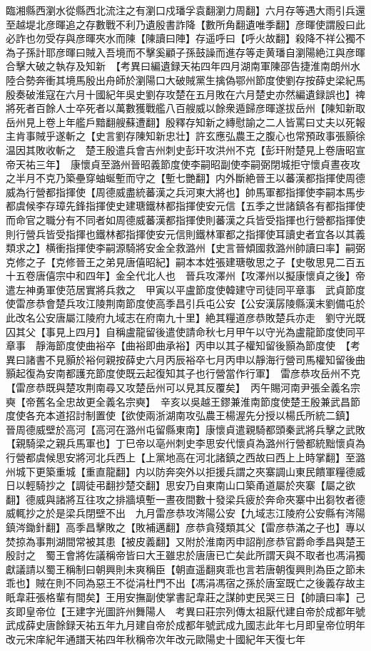 臨湘縣西瀏水從縣西北流注之有瀏口戍璠孚袁翻瀏力周翻】六月存等遇大雨引兵還至越堤北彦暉追之存數戰不利乃遺殷書詐降【數所角翻遺唯季翻】彦暉使謂殷曰此必詐也勿受存與彦暉夾水而陳【陳讀曰陣】存遥呼曰【呼火故翻】殺降不祥公獨不為子孫計耶彦暉曰賊入吾境而不擊奚顧子孫鼓譟而進存等走黄璠自瀏陽絶江與彦暉合擊大破之執存及知新　【考異曰編遺録天祐四年四月湖南軍陳邵告捷淮南朗州水陸合勢奔衝其境馬殷出舟師於瀏陽口大破賊黨生擒偽鄂州節度使劉存按薛史梁紀馬殷奏破淮寇在六月十國紀年吳史劉存攻楚在五月敗在六月楚史亦然編遺録誤也】禆將死者百餘人士卒死者以萬數獲戰艦八百艘威以餘衆遁歸彦暉遂拔岳州【陳知新取岳州見上卷上年艦戶黯翻艘蘇遭翻】殷釋存知新之縳慰諭之二人皆罵曰丈夫以死報主肯事賊乎遂斬之【史言劉存陳知新忠壮】許玄應弘農王之腹心也常預政事張顥徐温因其敗收斬之　楚王殷遣兵會吉州刺史彭玕攻洪州不克【彭玕附楚見上卷唐昭宣帝天祐三年】　康懷貞至潞州晉昭義節度使李嗣昭副使李嗣弼閉城拒守懷貞晝夜攻之半月不克乃築壘穿蚰蜒塹而守之【塹七艷翻】内外斷絶晉王以蕃漢都指揮使周德威為行營都指揮使【周德威盡統蕃漢之兵河東大將也】帥馬軍都指揮使李嗣本馬步都虞候李存璋先鋒指揮使史建瑭鐵林都指揮使安元信【五季之世諸鎮各有都指揮使而命官之職分有不同者如周德威蕃漢都指揮使則蕃漢之兵皆受指揮也行營都指揮使則行營兵皆受指揮也鐵林都指揮使安元信則鐵林軍都之指揮使耳讀史者宜各以其義類求之】横衝指揮使李嗣源騎將安金全救潞州【史言晉傾國救潞州帥讀曰率】嗣弼克修之子【克修晉王之弟見唐僖昭紀】嗣本本姓張建瑭敬思之子【史敬思見二百五十五卷唐僖宗中和四年】金全代北人也　晉兵攻澤州【攻澤州以擬康懷貞之後】帝遣左神勇軍使范居實將兵救之　甲寅以平盧節度使韓建守司徒同平章事　武貞節度使雷彦恭會楚兵攻江陵荆南節度使高季昌引兵屯公安【公安漢孱陵縣漢末劉備屯於此改名公安唐屬江陵府九域志在府南九十里】絶其糧道彦恭敗楚兵亦走　劉守光既囚其父【事見上四月】自稱盧龍留後遣使請命秋七月甲午以守光為盧龍節度使同平章事　靜海節度使曲裕卒【曲裕即曲承裕】丙申以其子權知留後顥為節度使　【考異曰諸書不見顥於裕何親按薛史六月丙辰裕卒七月丙申以靜海行營司馬權知留後曲顥起復為安南都護充節度使既云起復知其子也行營當作行軍】　雷彦恭攻岳州不克【雷彦恭既與楚攻荆南尋又攻楚岳州可以見其反覆矣】　丙午賜河南尹張全義名宗奭【帝舊名全忠故更全義名宗奭】　辛亥以吳越王鏐兼淮南節度使楚王殷兼武昌節度使各充本道招討制置使【欲使兩浙湖南攻弘農王楊渥先分授以楊氏所統二鎮】　晉周德威壁於高河【高河在潞州屯留縣東南】康懷貞遣親騎都頭秦武將兵擊之武敗【親騎梁之親兵馬軍也】丁巳帝以亳州刺史李思安代懷貞為潞州行營都統黜懷貞為行營都虞候思安將河北兵西上【上黨地高在河北諸鎮之西故曰西上上時掌翻】至潞州城下更築重城【重直龍翻】内以防奔突外以拒援兵謂之夾寨調山東民饋軍糧德威日以輕騎抄之【調徒弔翻抄楚交翻】思安乃自東南山口築甬道屬於夾寨【屬之欲翻】德威與諸將互往攻之排牆填塹一晝夜間數十發梁兵疲於奔命夾寨中出芻牧者德威輒抄之於是梁兵閉壁不出　九月雷彦恭攻涔陽公安【九域志江陵府公安縣有涔陽鎮涔鋤針翻】高季昌擊敗之【敗補邁翻】彦恭貪殘類其父【雷彦恭滿之子也】專以焚掠為事荆湖間常被其患【被皮義翻】又附於淮南丙申詔削彦恭官爵命季昌與楚王殷討之　蜀王會將佐議稱帝皆曰大王雖忠於唐唐已亡矣此所謂天與不取者也馮涓獨獻議請以蜀王稱制曰朝興則未爽稱臣【朝直遥翻爽乖也言若唐朝復興則為臣之節未乖也】賊在則不同為惡王不從涓杜門不出【馮涓馮宿之孫於唐室既亡之後義存故主眂韋莊張格輩有間矣】王用安撫副使掌書記韋莊之謀帥吏民哭三日【帥讀曰率】己亥即皇帝位【王建字光圖許州舞陽人　考異曰莊宗列傳太祖厭代建自帝於成都年號武成薛史唐餘録天祐五年九月建自帝於成都年號武成九國志此年七月即皇帝位明年改元宋庠紀年通譜天祐四年秋稱帝次年改元歐陽史十國紀年天復七年
